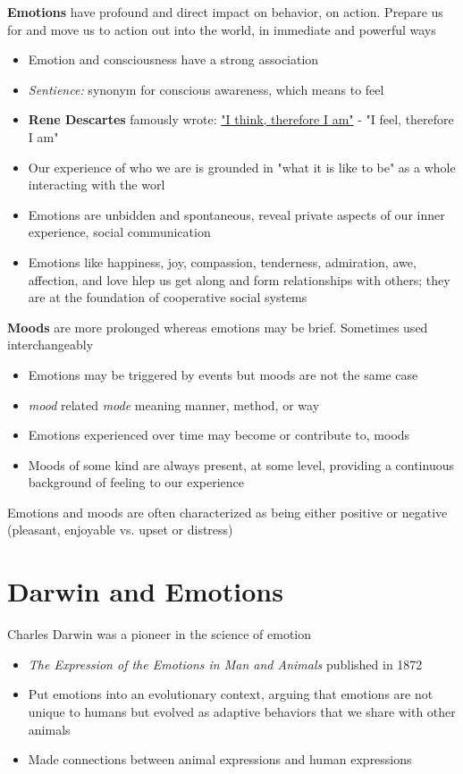 \documentclass{article}
\begin{document}
\noindent \textbf{Emotions} have profound and direct impact on behavior, on action. Prepare us for and move us to action out into the world, in immediate and powerful ways

\begin{itemize}
    \item Emotion and consciousness have a strong association
    \item \textit{Sentience:} synonym for conscious awareness, which means to feel
    \item \textbf{Rene Descartes} famously wrote: \underline{"I think, therefore I am"} - "I feel, therefore I am"
    \item Our experience of who we are is grounded in "what it is like to be" as a whole interacting with the worl
    \item Emotions are unbidden and spontaneous, reveal private aspects of our inner experience, social communication
    \item Emotions like happiness, joy, compassion, tenderness, admiration, awe, affection, and love hlep us get along and form relationships with others; they are at the foundation of cooperative social systems
\end{itemize}

\noindent \textbf{Moods} are more prolonged whereas emotions may be brief. Sometimes used interchangeably 
\begin{itemize}
    \item Emotions may be triggered by events but moods are not the same case
    \item \textit{mood} related \textit{mode} meaning manner, method, or way
    \item Emotions experienced over time may become or contribute to, moods
    \item Moods of some kind are always present, at some level, providing a continuous background of feeling to our experience 
\end{itemize}
Emotions and moods are often characterized as being either positive or negative (pleasant, enjoyable vs. upset or distress)

\section{Darwin and Emotions}
Charles Darwin was a pioneer in the science of emotion
\begin{itemize}
    \item \textit{The Expression of the Emotions in Man and Animals} published in 1872
    \item Put emotions into an evolutionary context, arguing that emotions are not unique to humans but evolved as adaptive behaviors that we share with other animals
    \item Made connections between animal expressions and human expressions
\end{itemize}
\end{document}
